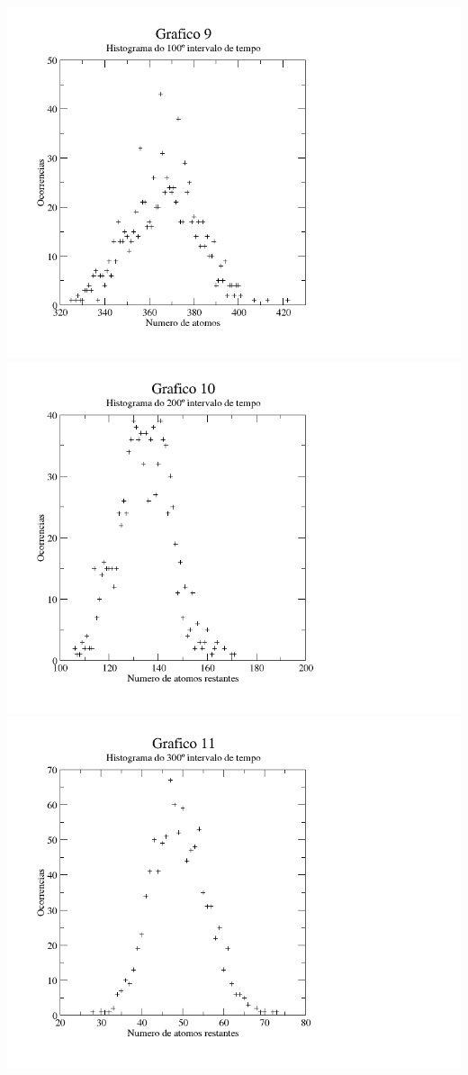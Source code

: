 \documentclass{article}
\begin{document}
\includegraphics[width=\textwidth]{graf9}
\includegraphics[width=\textwidth]{graf10}
\includegraphics[width=\textwidth]{graf11}
\end{document}
